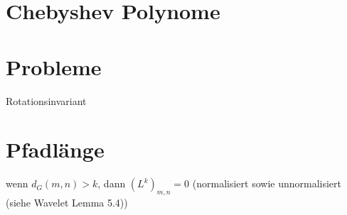 \section{Chebyshev Polynome}

\section{Probleme}

Rotationsinvariant

\section{Pfadlänge}

wenn $d_G(m,n) > k$, dann ${(L^k)}_{m, n} = 0$
(normalisiert sowie unnormalisiert (siehe Wavelet Lemma 5.4))

